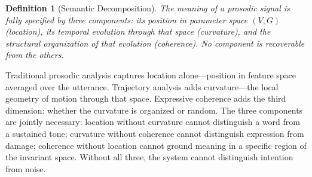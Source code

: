 \documentclass[12pt, a4paper]{article}
\newtheorem{definition}{Definition}
\begin{document}
\noindent \begin{definition}[Semantic Decomposition]
\label{def:semantic}
The meaning of a prosodic signal is fully specified by three components: its position in parameter space $(V, G)$ (location), its temporal evolution through that space (curvature), and the structural organization of that evolution (coherence). No component is recoverable from the others.
\end{definition}

Traditional prosodic analysis captures location alone---position in feature space averaged over the utterance. Trajectory analysis adds curvature---the local geometry of motion through that space. Expressive coherence adds the third dimension: whether the curvature is organized or random. The three components are jointly necessary: location without curvature cannot distinguish a word from a sustained tone; curvature without coherence cannot distinguish expression from damage; coherence without location cannot ground meaning in a specific region of the invariant space. Without all three, the system cannot distinguish intention from noise.
\end{document}
